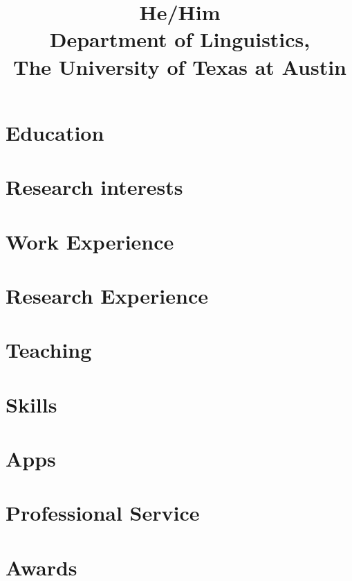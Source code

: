 \documentclass[11pt,a4paper]{mycv}
\title{He/Him\\Department of Linguistics,\\The University of Texas at Austin}
\begin{document}
\makecvtitle


\section{Education}


\section{Research interests}


\section{Work Experience}


\begingroup
\setlength\bibitemsep{0.5ex}
\printbibliography[title=Papers, nottype=unpublished]
\endgroup

\begingroup
\setlength\bibitemsep{0.5ex}
\printbibliography[title=Talks, type=unpublished]
\endgroup

\section{Research Experience}


\section{Teaching}


\section{Skills}


\newpage

\section{Apps}


\section{Professional Service}


\section{Awards}

\end{document}
